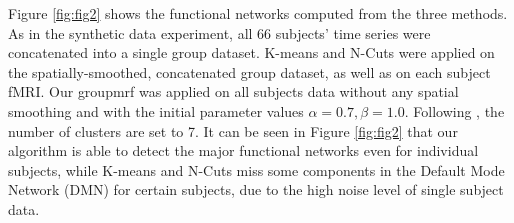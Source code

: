 \documentclass[runningheads,a4paper]{llncs}
\begin{document}
Figure \ref{fig:fig2} shows the functional networks computed from the three
methods. As in the synthetic data experiment, all 66 subjects' time series were
concatenated into a single group dataset. \textsf{K-means} and \textsf{N-Cuts}
were applied on the spatially-smoothed, concatenated group dataset, as well as
on each subject fMRI. Our \textsf{groupmrf} was applied on all subjects data
without any spatial smoothing and with the initial parameter values $\alpha =
0.7, \beta = 1.0$. Following \cite{van2008normalized,bellec2010multi}, the
number of clusters are set to 7. It can be seen in Figure \ref{fig:fig2} that
our algorithm is able to detect the major functional networks even for
individual subjects, while \textsf{K-means} and \textsf{N-Cuts} miss some
components in the Default Mode Network (DMN) for certain subjects, due to the
high noise level of single subject data.
\end{document}
